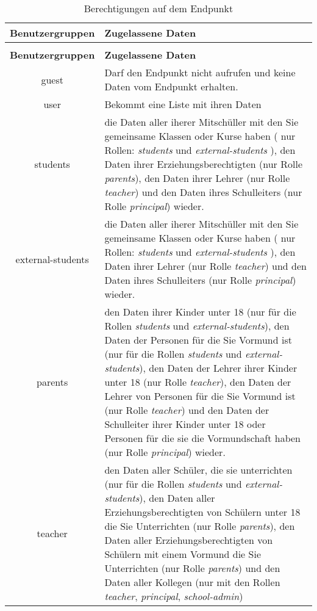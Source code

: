 \begin{longtable}{|c|p{}|}
\caption{Berechtigungen auf dem Endpunkt}
\label{tab:end:rest:api:school:users:get:right} \\
\hline
\textbf{Benutzergruppen} & \textbf{Zugelassene Daten} \\ \hline
\endfirsthead
\caption{Berechtigungen auf dem Endpunkt}\\
\hline
\textbf{Benutzergruppen} & \textbf{Zugelassene Daten} \\ \hline
\endhead
guest & Darf den Endpunkt nicht aufrufen und keine Daten vom Endpunkt erhalten. \\ \hline
user & Bekommt eine Liste mit ihren Daten \\ \hline 
students & die Daten aller iherer Mitschüller mit den Sie gemeinsame Klassen oder Kurse haben ( nur Rollen: \textit{students} und \textit{external-students} ),
           den Daten ihrer Erziehungsberechtigten (nur Rolle \textit{parents}), 
					 den Daten ihrer Lehrer (nur Rolle \textit{teacher}) und 
					 den Daten ihres Schulleiters (nur Rolle \textit{principal}) wieder.\\ \hline
external-students &  die Daten aller iherer Mitschüller mit den Sie gemeinsame Klassen oder Kurse haben ( nur Rollen: \textit{students} und \textit{external-students} ),
           den Daten ihrer Lehrer (nur Rolle \textit{teacher}) und 
					 den Daten ihres Schulleiters (nur Rolle \textit{principal}) wieder.\\ \hline
parents & den Daten ihrer Kinder unter 18 (nur für die Rollen \textit{students} und \textit{external-students}), 
					den Daten der Personen für die Sie Vormund ist (nur für die Rollen \textit{students} und \textit{external-students}), 
					den Daten der Lehrer ihrer Kinder unter 18 (nur Rolle \textit{teacher}),
					den Daten der Lehrer von Personen für die Sie Vormund ist (nur Rolle \textit{teacher})	und
					den Daten der Schulleiter ihrer Kinder unter 18 oder Personen für die sie die Vormundschaft haben (nur Rolle \textit{principal})
					wieder.\\ \hline
teacher & den Daten aller Schüler, die sie unterrichten (nur für die Rollen \textit{students} und \textit{external-students}),
					den Daten aller Erziehungsberechtigten von Schülern unter 18 die Sie Unterrichten (nur Rolle \textit{parents}),
					den Daten aller Erziehungsberechtigten von Schülern mit einem Vormund die Sie Unterrichten (nur Rolle \textit{parents}) und
					den Daten aller Kollegen (nur mit den Rollen \textit{teacher}, \textit{principal}, \textit{school-admin}) 

\end{longtable}
